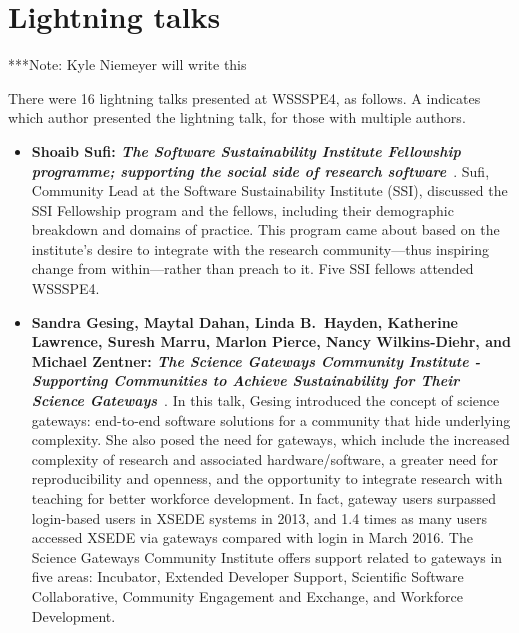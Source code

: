 \documentclass[11pt, oneside]{amsart}
\newcommand{\note}[1]{ {\textcolor{blueish}    { ***Note:      #1 }}}
\begin{document}
\section{Lightning talks} \label{sec:lightning}
\begin{comment}
\note{
\href{http://wssspe.researchcomputing.org.uk/wssspe4/agenda/}{Slides.}}
\end{comment}

\note{Kyle Niemeyer will write this}

There were 16 lightning talks presented at WSSSPE4, as follows.
%
A \textsuperscript{\textasteriskcentered} indicates which author presented the
lightning talk, for those with multiple authors.
%
\begin{itemize}[itemsep=1ex]
    \item \textbf{Shoaib Sufi: \emph{The Software Sustainability Institute Fellowship
    programme; supporting the social side of research software}}~\cite{Sufi:2016ws}.
    Sufi, Community Lead at the Software Sustainability Institute (SSI), discussed
    the SSI Fellowship program and the fellows, including their
    demographic breakdown and domains of practice. This program came about
    based on the institute's desire to integrate with the research community---thus
    inspiring change from within---rather than preach to it. Five SSI fellows
    attended WSSSPE4.

    \item \textbf{Sandra Gesing, Maytal Dahan, Linda B.~Hayden, Katherine Lawrence,
    Suresh Marru, Marlon Pierce, Nancy Wilkins-Diehr, and Michael Zentner:
    \emph{The Science Gateways Community Institute - Supporting Communities to
    Achieve Sustainability for Their Science Gateways}}~\cite{Gesing:2016ws}.
    In this talk, Gesing introduced the concept of science gateways: end-to-end software
    solutions for a community that hide underlying complexity. She also posed the need
    for gateways, which include the increased complexity of research and associated
    hardware\slash software, a greater need for reproducibility and openness, and the
    opportunity to integrate research with teaching for better workforce development.
    In fact, gateway users surpassed login-based users in XSEDE systems in 2013,
    and 1.4 times as many users accessed XSEDE via gateways compared with
    login in March 2016. The Science Gateways Community Institute offers support
    related to gateways in five areas: Incubator, Extended Developer Support, Scientific
    Software Collaborative, Community Engagement and Exchange, and Workforce
    Development.


\end{itemize}
\end{document}

